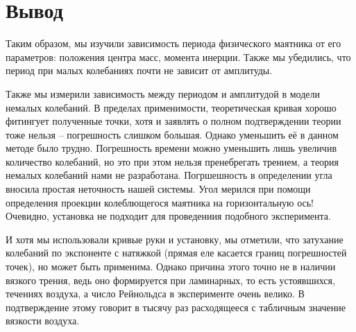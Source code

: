 \documentclass[a4paper, 10pt]{article}%
\begin{document}
\section*{Вывод}
Таким образом, мы изучили зависимость периода физического маятника от его параметров: положения центра масс, момента инерции. Также мы убедились, что период при малых колебаниях почти не зависит от амплитуды.%

Также мы измерили зависимость между периодом и амплитудой в модели немалых колебаний. В пределах применимости, теоретическая кривая хорошо фитингует полученные точки, хотя и заявлять о полном подтверждении теории тоже нельзя -- погрешность слишком большая. Однако уменьшить её в данном методе было трудно. Погрешность времени можно уменьшить лишь увеличив количество колебаний, но это при этом нельзя пренебрегать трением, а теория немалых колебаний нами не разработана. Погршешность в определении угла вносила простая неточность нашей системы. Угол мерился  при помощи определения проекции колеблющегося маятника на горизонтальную ось! Очевидно, установка не подходит для проведениия подобного эксперимента. 

И хотя мы использовали кривые руки и установку, мы отметили, что затухание колебаний по экспоненте с натяжкой (прямая еле касается границ погрешностей точек), но может быть применима. Однако причина этого точно не в наличии вязкого трения, ведь оно формируется при ламинарных, то есть устоявшихся, течениях воздуха, а число Рейнольдса в эксперименте очень велико. В подтверждение этому говорит в тысячу раз расходящееся с табличным значение вязкости воздуха.
\end{document}
